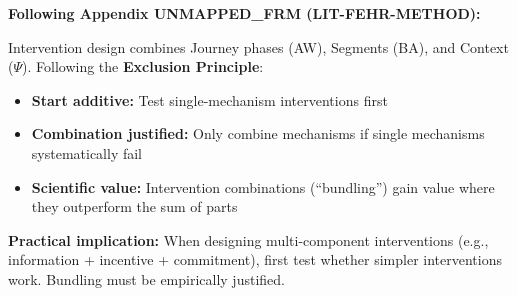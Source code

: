 \begin{tcolorbox}[colback=red!5!white, colframe=red!75!black,
    title=\textbf{Methodological Note: The Exclusion Principle (Appendix UNMAPPED_FRM)}]
\textbf{Following Appendix UNMAPPED_FRM (LIT-FEHR-METHOD):}

Intervention design combines Journey phases (AW), Segments (BA), and Context ($\Psi$). Following the \textbf{Exclusion Principle}:
\begin{itemize}[nosep]
    \item \textbf{Start additive:} Test single-mechanism interventions first
    \item \textbf{Combination justified:} Only combine mechanisms if single mechanisms systematically fail
    \item \textbf{Scientific value:} Intervention combinations (``bundling'') gain value where they outperform the sum of parts
\end{itemize}

\textbf{Practical implication:} When designing multi-component interventions (e.g., information + incentive + commitment), first test whether simpler interventions work. Bundling must be empirically justified.
\end{tcolorbox}


